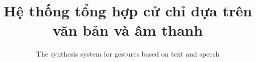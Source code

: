 \documentclass[10pt,mathserif]{beamer}
\title{\large \bfseries Hệ thống tổng hợp cử chỉ dựa trên \\ văn bản và âm thanh}
\subtitle{The synthesis system for gestures based on text and speech}
\begin{document}
\begin{frame}[plain]
	\titlepage
\end{frame}










%







%

\end{document}
